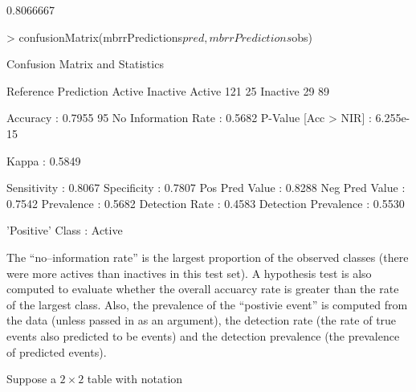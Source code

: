 \documentclass[12pt]{article}
\begin{document}
\begin{small}
\begin{Schunk}
\begin{Soutput}
[1] 0.8066667
\end{Soutput}
\begin{Sinput}
> confusionMatrix(mbrrPredictions$pred, mbrrPredictions$obs)
\end{Sinput}
\begin{Soutput}
Confusion Matrix and Statistics

          Reference
Prediction Active Inactive
  Active      121       25
  Inactive     29       89
                                        
             Accuracy : 0.7955          
               95% CI : (0.7417, 0.8424)
  No Information Rate : 0.5682          
  P-Value [Acc > NIR] : 6.255e-15       
                                        
                Kappa : 0.5849          
                                        
          Sensitivity : 0.8067          
          Specificity : 0.7807          
       Pos Pred Value : 0.8288          
       Neg Pred Value : 0.7542          
           Prevalence : 0.5682          
       Detection Rate : 0.4583          
 Detection Prevalence : 0.5530          
                                        
     'Positive' Class : Active          
\end{Soutput}
\end{Schunk}
\end{small}

The ``no--information rate'' is the largest proportion of the observed classes (there were more actives than inactives in this test set). A hypothesis test is also computed to evaluate whether the overall accuarcy rate is greater than the rate of the largest class. Also, the prevalence of the ``postivie event'' is computed from the data (unless passed in as an argument), the detection rate (the rate of true events also 
predicted to be events) and the detection prevalence (the prevalence of predicted events).

Suppose a $2 $ table with notation
\end{document}
